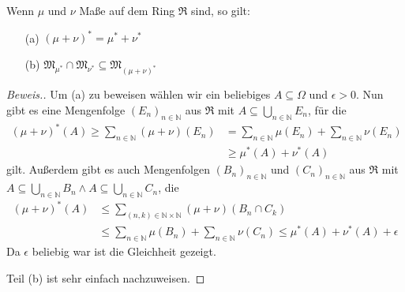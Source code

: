 \begin{lemma}
    Wenn $\mu$ und $\nu$ Maße auf dem Ring $\mathfrak{R}$ sind, so gilt:
    \begin{itemize}
        \item[(a)] $(\mu+\nu)^*=\mu^*+\nu^*$
        \item[(b)] $\mathfrak{M}_{\mu^*}\cap\mathfrak{M}_{\nu^*}\subseteq\mathfrak{M}_{(\mu+\nu)^*}$ 
    \end{itemize}
\end{lemma}
\begin{proof}[Beweis.]
    Um (a) zu beweisen wählen wir ein beliebiges $A\subseteq\Omega$ und $\epsilon>0$. Nun gibt es eine Mengenfolge $(E_n)_{n\in\mathbb{N}}$ aus $\mathfrak{R}$ mit $A\subseteq\bigcup_{n\in\mathbb{N}}E_n$, für die 
    \begin{align*}
        (\mu+\nu)^*(A)\geq\sum_{n\in\mathbb{N}}(\mu+\nu)(E_n)&=\sum_{n\in\mathbb{N}}\mu(E_n)+\sum_{n\in\mathbb{N}}\nu(E_n)\\
        &\geq\mu^*(A)+\nu^*(A)
    \end{align*}
    gilt. Außerdem gibt es auch Mengenfolgen $(B_n)_{n\in\mathbb{N}}$ und $(C_n)_{n\in\mathbb{N}}$ aus $\mathfrak{R}$ mit $A\subseteq\bigcup_{n\in\mathbb{N}}B_n\land A\subseteq\bigcup_{n\in\mathbb{N}}C_n$, die 
    \begin{align*}
        (\mu+\nu)^*(A)&\leq\sum_{(n,k)\in\mathbb{N}\times\mathbb{N}}(\mu+\nu)(B_n\cap C_k)\\
        &\leq\sum_{n\in\mathbb{N}}\mu(B_n)+\sum_{n\in\mathbb{N}}\nu(C_n)\leq\mu^*(A)+\nu^*(A)+\epsilon
    \end{align*}
    Da $\epsilon$ beliebig war ist die Gleichheit gezeigt.

    Teil (b) ist sehr einfach nachzuweisen.
\end{proof}